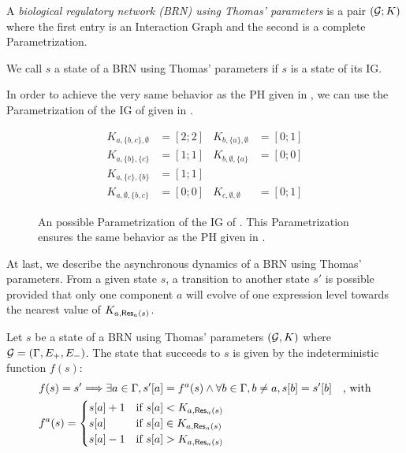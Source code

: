 \begin{definition}\label{def:brn}
A \emph{biological regulatory network (BRN) using Thomas' parameters} is a pair $(\mathcal{G}; K)$ where the first entry is an Interaction Graph and the second is a complete Parametrization.
\end{definition}
We call $s$ a state of a BRN using Thomas' parameters if $s$ is a state of its IG.

\begin{example*}
In order to achieve the very same behavior as the PH given in , we can use the Parametrization of the IG of  given in .

\begin{figure}[t]
\begin{align*}
K_{a,\{b,c\},\emptyset} &= [2 ; 2] & K_{b,\{a\},\emptyset} &= [0 ; 1] \\
K_{a,\{b\},\{c\}} &= [1 ; 1] & K_{b,\emptyset,\{a\}} &= [0 ; 0] \\
K_{a,\{c\},\{b\}} &= [1 ; 1] &&\\
K_{a,\emptyset,\{b,c\}} &= [0 ; 0] & K_{c,\emptyset,\emptyset} &= [0 ; 1]
\end{align*}
\caption{\label{fig:runningBRN-param}
An possible Parametrization of the IG of .
This Parametrization ensures the same behavior as the PH given in .
}
\end{figure}
\end{example*}

At last, we describe the asynchronous dynamics of a BRN using Thomas' parameters.
From a given state $s$, a transition to another state $s'$ is possible provided that only one component $a$ will evolve of one expression level towards the nearest value of $K_{a,\mathsf{Res}_{a}(s)}$.

\begin{definition}\label{def:dynamics}
Let $s$ be a state of a BRN using Thomas' parameters $(\mathcal{G}, K)$ where $\mathcal{G} = (\Gamma, E_+, E_-)$.
The state that succeeds to $s$ is given by the indeterministic function $f(s)$:
\begin{align*}
  & f(s) = s' \Longrightarrow \exists a \in \Gamma,
    {s'[a]} = f^a(s) \wedge
    \forall b \in \Gamma, b \neq a, {s[b]} = {s'[b]}
    \quad\text{, with}\\
  & f^a(s) =
  \begin{cases}
    {s[a]} + 1 & \text{if } {s[a]} < K_{a, \mathsf{Res}_{a}(s)} \\
    {s[a]} & \text{if } {s[a]} \in K_{a,\mathsf{Res}_{a}(s)}\\
    {s[a]} - 1 & \text{if } {s[a]} > K_{a,\mathsf{Res}_{a}(s)}
  \end{cases}
\end{align*}
\end{definition}

